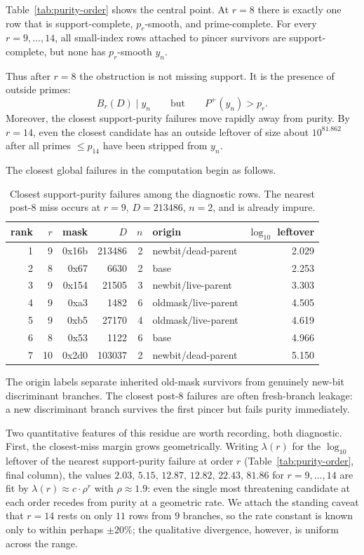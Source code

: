 \documentclass[11pt]{article}
\theoremstyle{definition}
\newcommand{\Pplus}{P^{+}}
\begin{document}
Table~\ref{tab:purity-order} shows the central point.  At $r=8$ there is exactly
one row that is support-complete, $p_r$-smooth, and prime-complete.  For every
$r=9,\ldots,14$, all small-index rows attached to pincer survivors are
support-complete, but none has $p_r$-smooth $y_n$.

Thus after $r=8$ the obstruction is not missing support.  It is the presence of
outside primes:
\[
  B_r(D)\mid y_n
  \qquad\text{but}\qquad
  \Pplus(y_n)>p_r.
\]
Moreover, the closest support-purity failures move rapidly away from purity.  By
$r=14$, even the closest candidate has an outside leftover of size about
$10^{81.862}$ after all primes $\le p_{14}$ have been stripped from $y_n$.

The closest global failures in the computation begin as follows.
\begin{table}[H]
\centering
\small
\begin{tabular}{rrrrrlr}
\toprule
rank & $r$ & mask & $D$ & $n$ & origin & $\log_{10}$ leftover \\
\midrule
1 & 9  & 0x16b & 213486 & 2 & newbit/dead-parent & 2.029 \\
2 & 8  & 0x67  & 6630   & 2 & base & 2.253 \\
3 & 9  & 0x154 & 21505  & 3 & newbit/live-parent & 3.303 \\
4 & 9  & 0xa3  & 1482   & 6 & oldmask/live-parent & 4.505 \\
5 & 9  & 0xb5  & 27170  & 4 & oldmask/live-parent & 4.619 \\
6 & 8  & 0x53  & 1122   & 6 & base & 4.966 \\
7 & 10 & 0x2d0 & 103037 & 2 & newbit/dead-parent & 5.150 \\
\bottomrule
\end{tabular}
\caption{Closest support-purity failures among the diagnostic rows.  The nearest
post-$8$ miss occurs at $r=9$, $D=213486$, $n=2$, and is already impure.}
\label{tab:closest}
\end{table}

The origin labels separate inherited old-mask survivors from genuinely new-bit
discriminant branches.  The closest post-$8$ failures are often fresh-branch
leakage: a new discriminant branch survives the first pincer but fails purity
immediately.

Two quantitative features of this residue are worth recording, both diagnostic.
First, the closest-miss margin grows geometrically.  Writing $\lambda(r)$ for the
$\log_{10}$ leftover of the nearest support-purity failure at order $r$
(Table~\ref{tab:purity-order}, final column), the values
$2.03,\,5.15,\,12.87,\,12.82,\,22.43,\,81.86$ for $r=9,\ldots,14$ are fit by
$\lambda(r)\approx c\cdot\rho^{r}$ with $\rho\approx 1.9$: even the single most
threatening candidate at each order recedes from purity at a geometric rate.  We
attach the standing caveat that $r=14$ rests on only $11$ rows from $9$ branches,
so the rate constant is known only to within perhaps $\pm20\%$; the qualitative
divergence, however, is uniform across the range.
\end{document}

